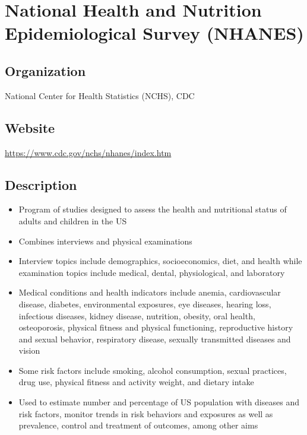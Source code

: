 \documentclass[
]{book}
\providecommand{\tightlist}{%
  \setlength{\itemsep}{0pt}\setlength{\parskip}{0pt}}
\begin{document}
\mainmatter

\hypertarget{national-health-and-nutrition-epidemiological-survey-nhanes}{%
\chapter{National Health and Nutrition Epidemiological Survey (NHANES)}\label{national-health-and-nutrition-epidemiological-survey-nhanes}}

\hypertarget{organization-50}{%
\section{Organization}\label{organization-50}}

National Center for Health Statistics (NCHS), CDC

\hypertarget{website-50}{%
\section{Website}\label{website-50}}

\url{https://www.cdc.gov/nchs/nhanes/index.htm}

\hypertarget{description-50}{%
\section{Description}\label{description-50}}

\begin{itemize}
\tightlist
\item
  Program of studies designed to assess the health and nutritional status of adults and children in the US
\item
  Combines interviews and physical examinations
\item
  Interview topics include demographics, socioeconomics, diet, and health while examination topics include medical, dental, physiological, and laboratory
\item
  Medical conditions and health indicators include anemia, cardiovascular disease, diabetes, environmental exposures, eye diseases, hearing loss, infectious diseases, kidney disease, nutrition, obesity, oral health, osteoporosis, physical fitness and physical functioning, reproductive history and sexual behavior, respiratory disease, sexually transmitted diseases and vision
\item
  Some risk factors include smoking, alcohol consumption, sexual practices, drug use, physical fitness and activity weight, and dietary intake
\item
  Used to estimate number and percentage of US population with diseases and risk factors, monitor trends in risk behaviors and exposures as well as prevalence, control and treatment of outcomes, among other aims
\end{itemize}
\end{document}

